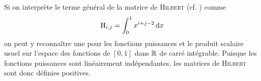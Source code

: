 Si on interprète le terme général de la matrice de \textsc{Hilbert} (cf. ) comme 
$$\mathrm{H}_{i,j} = \int_{0}^{1} x^{i+j-2} \, \mathrm{d} x$$
on peut y reconnaître une  pour les fonctions puissances et le produit scalaire usuel sur l'espace des fonctions de $[0, 1]$ dans $\mathbb{R}$ de carré intégrable. Puisque les fonctions puissances sont linéairement indépendantes, les matrices de \textsc{Hilbert} sont donc définies positives.
